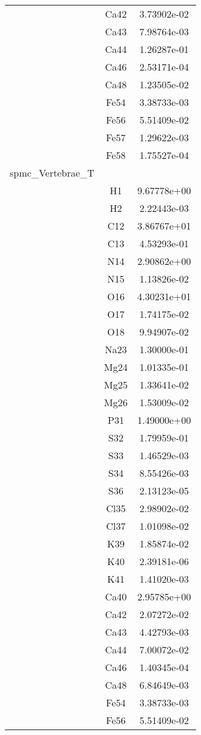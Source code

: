 \begin{centering}
\begin{longtable}{l c c}
& Ca42 & 3.73902e-02 \\ 
& Ca43 & 7.98764e-03 \\ 
& Ca44 & 1.26287e-01 \\ 
& Ca46 & 2.53171e-04 \\ 
& Ca48 & 1.23505e-02 \\ 
& Fe54 & 3.38733e-03 \\ 
& Fe56 & 5.51409e-02 \\ 
& Fe57 & 1.29622e-03 \\ 
& Fe58 & 1.75527e-04 \\ 
\hline
spmc_Vertebrae_T & & \\
\hline
& H1 & 9.67778e+00 \\ 
& H2 & 2.22443e-03 \\ 
& C12 & 3.86767e+01 \\ 
& C13 & 4.53293e-01 \\ 
& N14 & 2.90862e+00 \\ 
& N15 & 1.13826e-02 \\ 
& O16 & 4.30231e+01 \\ 
& O17 & 1.74175e-02 \\ 
& O18 & 9.94907e-02 \\ 
& Na23 & 1.30000e-01 \\ 
& Mg24 & 1.01335e-01 \\ 
& Mg25 & 1.33641e-02 \\ 
& Mg26 & 1.53009e-02 \\ 
& P31 & 1.49000e+00 \\ 
& S32 & 1.79959e-01 \\ 
& S33 & 1.46529e-03 \\ 
& S34 & 8.55426e-03 \\ 
& S36 & 2.13123e-05 \\ 
& Cl35 & 2.98902e-02 \\ 
& Cl37 & 1.01098e-02 \\ 
& K39 & 1.85874e-02 \\ 
& K40 & 2.39181e-06 \\ 
& K41 & 1.41020e-03 \\ 
& Ca40 & 2.95785e+00 \\ 
& Ca42 & 2.07272e-02 \\ 
& Ca43 & 4.42793e-03 \\ 
& Ca44 & 7.00072e-02 \\ 
& Ca46 & 1.40345e-04 \\ 
& Ca48 & 6.84649e-03 \\ 
& Fe54 & 3.38733e-03 \\ 
& Fe56 & 5.51409e-02 \\ 

\end{longtable}
\end{centering}
